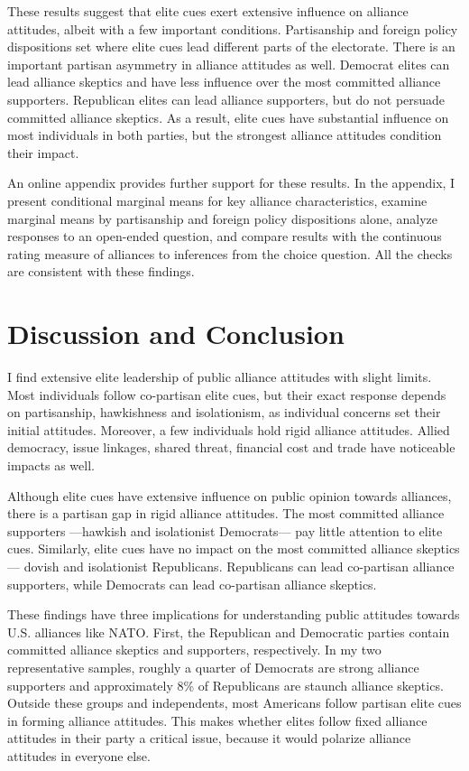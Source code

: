 \documentclass[12pt]{article}
\begin{document}
These results suggest that elite cues exert extensive influence on alliance attitudes, albeit with a few important conditions.
Partisanship and foreign policy dispositions set where elite cues lead different parts of the electorate. 
There is an important partisan asymmetry in alliance attitudes as well. 
Democrat elites can lead alliance skeptics and have less influence over the most committed alliance supporters. 
Republican elites can lead alliance supporters, but do not persuade committed alliance skeptics. 
As a result, elite cues have substantial influence on most individuals in both parties, but the strongest alliance attitudes condition their impact. 


An online appendix provides further support for these results. 
In the appendix, I present conditional marginal means for key alliance characteristics, examine marginal means by partisanship and foreign policy dispositions alone, analyze responses to an open-ended question, and compare results with the continuous rating measure of alliances to inferences from the choice question.
All the checks are consistent with these findings. 


\section{Discussion and Conclusion} 


I find extensive elite leadership of public alliance attitudes with slight limits.  
Most individuals follow co-partisan elite cues, but their exact response depends on partisanship, hawkishness and isolationism, as individual concerns set their initial attitudes.
Moreover, a few individuals hold rigid alliance attitudes. 
Allied democracy, issue linkages, shared threat, financial cost and trade have noticeable impacts as well.  


Although elite cues have extensive influence on public opinion towards alliances, there is a partisan gap in rigid alliance attitudes. 
The most committed alliance supporters ---hawkish and isolationist Democrats--- pay little attention to elite cues.
Similarly, elite cues have no impact on the most committed alliance skeptics --- dovish and isolationist Republicans. 
Republicans can lead co-partisan alliance supporters, while Democrats can lead co-partisan alliance skeptics. 


These findings have three implications for understanding public attitudes towards U.S. alliances like NATO. 
First, the Republican and Democratic parties contain committed alliance skeptics and supporters, respectively.
In my two representative samples, roughly a quarter of Democrats are strong alliance supporters and approximately 8\% of Republicans are staunch alliance skeptics.
Outside these groups and independents, most Americans follow partisan elite cues in forming alliance attitudes. 
This makes whether elites follow fixed alliance attitudes in their party a critical issue, because it would polarize alliance attitudes in everyone else.  
\end{document}
